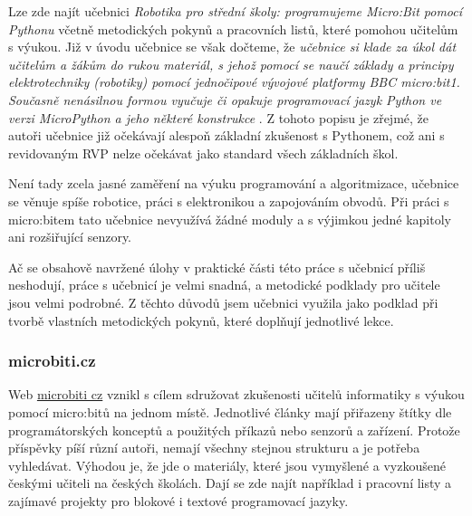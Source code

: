 \documentclass[
  digital,     %
  oneside,     %
  nosansbold,  %
  colorbold, %
  lof,         %
  nolot,         %
]{fithesis4}
\begin{document}
Lze zde najít učebnici \textit{Robotika pro střední školy: programujeme Micro:Bit pomocí Pythonu} včetně metodických pokynů a pracovních listů, které pomohou učitelům s výukou. Již v úvodu učebnice se však dočteme, že \textit{učebnice si klade za úkol dát učitelům a žákům do rukou materiál, s jehož pomocí se naučí základy a principy elektrotechniky (robotiky) pomocí jednočipové vývojové platformy BBC micro:bit1. Současně nenásilnou formou vyučuje či opakuje programovací jazyk Python ve verzi MicroPython a jeho některé konstrukce} \cite{pythonImysleni}. Z tohoto popisu je zřejmé, že autoři učebnice již očekávají alespoň základní zkušenost s Pythonem, což ani s revidovaným RVP nelze očekávat jako standard všech základních škol. 

Není tady zcela jasné zaměření na výuku programování a algoritmizace, učebnice se věnuje spíše robotice, práci s elektronikou a zapojováním obvodů. Při práci s micro:bitem tato učebnice nevyužívá žádné moduly a s výjimkou jedné kapitoly ani rozšiřující senzory. 

Ač se obsahově navržené úlohy v praktické části této práce s učebnicí příliš neshodují, práce s učebnicí je velmi snadná, a metodické podklady pro učitele jsou velmi podrobné. Z těchto důvodů jsem učebnici využila jako podklad při tvorbě vlastních metodických pokynů, které doplňují jednotlivé lekce.

\subsubsection{microbiti.cz}
Web \href{microbiti.cz}{microbiti cz} vznikl s cílem sdružovat zkušenosti učitelů informatiky s výukou pomocí micro:bitů na jednom místě. Jednotlivé články mají přiřazeny štítky dle programátorských konceptů a použitých příkazů nebo senzorů a zařízení. Protože příspěvky píší různí autoři, nemají všechny stejnou strukturu a je potřeba vyhledávat. Výhodou je, že jde o materiály, které jsou vymyšlené a vyzkoušené českými učiteli na českých školách. Dají se zde najít například i pracovní listy a zajímavé projekty pro blokové i textové programovací jazyky.
\end{document}
